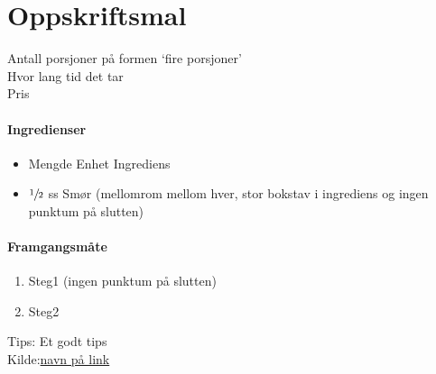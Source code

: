 \section{﻿Oppskriftsmal}
\label{oppskrifsmal}

Antall porsjoner på formen `fire porsjoner'\\
Hvor lang tid det tar\\
Pris

\paragraph{Ingredienser}
\begin{itemize}[noitemsep]
	\item Mengde Enhet Ingrediens
	\item $\sfrac{1}{2}$ ss Smør (mellomrom mellom hver, stor bokstav i ingrediens og ingen punktum på slutten)
\end{itemize}

\paragraph{Framgangsmåte}
\begin{enumerate}[noitemsep]
	\item Steg1 (ingen punktum på slutten)
	\item Steg2
\end{enumerate}

Tips: Et godt tips \\

Kilde:\href{https://link}{navn på link}
